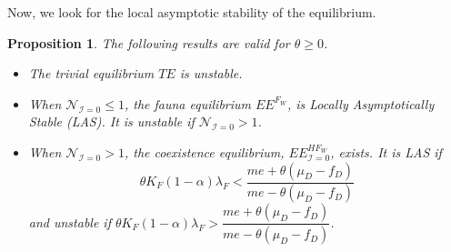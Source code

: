 \documentclass{article}
\newcommand{\cI}{\mathcal{I}}
\newtheorem{prop}{Proposition}
\begin{document}
Now, we look for the local asymptotic stability of the equilibrium.

\begin{prop}\label{propLAS, I=0} The following results are valid for $\theta \geq 0$.
\begin{itemize}
\item The trivial equilibrium $TE$ is unstable.
\item When $\mathcal{N}_{\cI = 0} \leq 1$, the fauna equilibrium $EE^{F_W}$, is Locally Asymptotically Stable (LAS). It is unstable if $\mathcal{N}_{\cI = 0} > 1$. 
\item When $\mathcal{N}_{\cI = 0} > 1$, the coexistence equilibrium, $EE^{HF_W}_{\cI =0}$, exists. It is LAS if 
\begin{equation}
    \theta K_{F}(1-\alpha)\lambda_{F}<\dfrac{me+\theta(\mu_{D}-f_{D})}{me-\theta(\mu_{D}-f_{D})}
    \label{condition_EEHF_LAS}
\end{equation}
and unstable if $\theta K_{F}(1-\alpha)\lambda_{F} > \dfrac{me+\theta(\mu_{D}-f_{D})}{me-\theta(\mu_{D}-f_{D})}$.
\end{itemize}
\end{prop}
\end{document}
